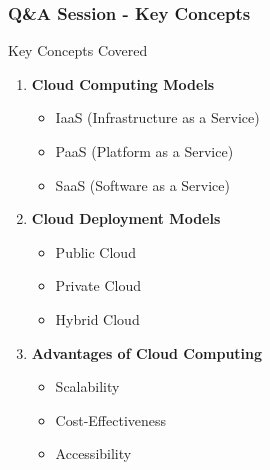 \documentclass[aspectratio=169]{beamer}
\begin{document}
\begin{frame}[fragile]
    \frametitle{Q\&A Session - Key Concepts}
    \begin{block}{Key Concepts Covered}
        \begin{enumerate}
            \item \textbf{Cloud Computing Models}
              \begin{itemize}
                  \item IaaS (Infrastructure as a Service)
                  \item PaaS (Platform as a Service)
                  \item SaaS (Software as a Service)
              \end{itemize}
            \item \textbf{Cloud Deployment Models}
              \begin{itemize}
                  \item Public Cloud
                  \item Private Cloud
                  \item Hybrid Cloud
              \end{itemize}
            \item \textbf{Advantages of Cloud Computing}
              \begin{itemize}
                  \item Scalability
                  \item Cost-Effectiveness
                  \item Accessibility
              \end{itemize}
        \end{enumerate}
    \end{block}
\end{frame}
\end{document}
